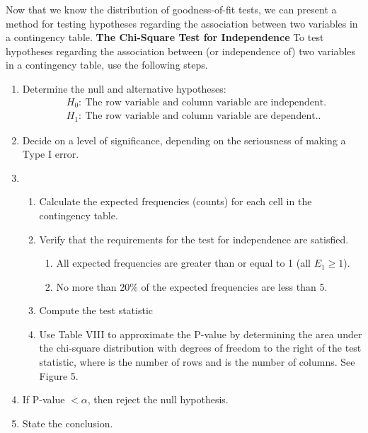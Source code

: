 \documentclass{report}
\begin{document}
        \bigbreak \noindent 
        Now that we know the distribution of goodness-of-fit tests, we can present a method for testing hypotheses regarding the association between two variables in a contingency table.
        \bigbreak \noindent 
        \textbf{The Chi-Square Test for Independence}
        \bigbreak \noindent 
        To test hypotheses regarding the association between (or independence of) two variables in a contingency table, use the following steps.
        \begin{enumerate}
            \item  Determine the null and alternative hypotheses:
                \begin{align*}
                    &H_{0}:\ \text{The row variable and column variable are independent.} \\
                    &H_{1}:\ \text{The row variable and column variable are dependent.}
                .\end{align*}
            \item Decide on a level of significance, depending on the seriousness of making a Type I error.
            \item \begin{enumerate}
                    \item  Calculate the expected frequencies (counts) for each cell in the contingency table.
                    \item  Verify that the requirements for the test for independence are satisfied.
                        \begin{enumerate}
                            \item All expected frequencies are greater than or equal to 1  (all $E_{1} \geq1$).
                            \item No more than 20\% of the expected frequencies are less than 5.
                        \end{enumerate}
                    \item  Compute the test statistic
                    \item  Use Table VIII to approximate the P-value by determining the area under the chi-square distribution with degrees of freedom to the right of the test statistic, where is the number of rows and is the number of columns. See Figure 5.
            \end{enumerate}
            \item If P-value $< \alpha$, then reject the null hypothesis.
            \item State the conclusion.
        \end{enumerate}
\end{document}
